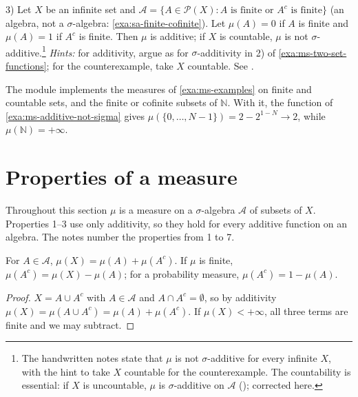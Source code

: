 \begin{example}\label{exa:ms-zero-one-cofinite}
3) Let $X$ be an infinite set and
$\mathcal A=\{A\in\mathcal P(X):A\text{ is finite or }A^c\text{ is finite}\}$ (an algebra, not
a $\sigma$-algebra: \cref{exa:sa-finite-cofinite}). Let $\mu(A)=0$ if $A$ is finite and $\mu(A)=1$ if $A^c$ is finite. Then
$\mu$ is additive; if $X$ is countable, $\mu$ is not $\sigma$-additive.\footnote{The
handwritten notes state that $\mu$ is not $\sigma$-additive for every infinite $X$, with the
hint to take $X$ countable for the counterexample. The countability is essential: if $X$ is
uncountable, $\mu$ is $\sigma$-additive on $\mathcal A$ ();
corrected here.} \emph{Hints:} for additivity, argue as for $\sigma$-additivity in 2) of
\cref{exa:ms-two-set-functions}; for the counterexample, take $X$ countable. See
.
\end{example}

\begin{remark}[computational]\label{rem:ms-code-measures}
The module  implements the measures of
\cref{exa:ms-examples} on finite and countable sets, and the finite or cofinite subsets of
$\mathbb N$. With it, the function of \cref{exa:ms-additive-not-sigma} gives
$\mu(\{0,\dots,N-1\})=2-2^{1-N}\to2$, while $\mu(\mathbb N)=+\infty$.
\end{remark}

\section{Properties of a measure}\label{sec:ms-properties}

Throughout this section $\mu$ is a measure on a $\sigma$-algebra $\mathcal A$ of subsets of
$X$. Properties 1--3 use only additivity, so they hold for every additive function on an
algebra. The notes number the properties from 1 to 7.

\begin{proposition}\label{prop:ms-complement}
For $A\in\mathcal A$, $\mu(X)=\mu(A)+\mu(A^c)$. If $\mu$ is finite,
$\mu(A^c)=\mu(X)-\mu(A)$; for a probability measure, $\mu(A^c)=1-\mu(A)$.
\end{proposition}

\begin{proof}
$X=A\cup A^c$ with $A\in\mathcal A$ and $A\cap A^c=\emptyset$, so by additivity
$\mu(X)=\mu(A\cup A^c)=\mu(A)+\mu(A^c)$. If $\mu(X)<+\infty$, all three terms are finite and we
may subtract.
\end{proof}

